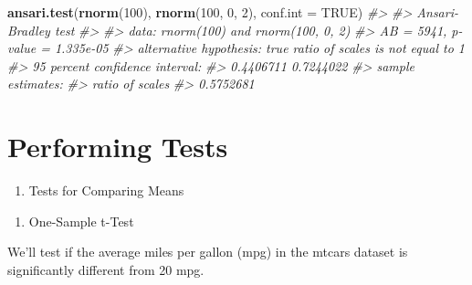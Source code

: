 \documentclass[
]{book}
\newenvironment{Shaded}{\begin{snugshade}}{\end{snugshade}}
\newcommand{\AttributeTok}[1]{\textcolor[rgb]{0.13,0.29,0.53}{#1}}
\newcommand{\CommentTok}[1]{\textcolor[rgb]{0.56,0.35,0.01}{\textit{#1}}}
\newcommand{\ConstantTok}[1]{\textcolor[rgb]{0.56,0.35,0.01}{#1}}
\newcommand{\DecValTok}[1]{\textcolor[rgb]{0.00,0.00,0.81}{#1}}
\newcommand{\FunctionTok}[1]{\textcolor[rgb]{0.13,0.29,0.53}{\textbf{#1}}}
\newcommand{\NormalTok}[1]{#1}
\newcommand{\SpecialCharTok}[1]{\textcolor[rgb]{0.81,0.36,0.00}{\textbf{#1}}}
\providecommand{\tightlist}{%
  \setlength{\itemsep}{0pt}\setlength{\parskip}{0pt}}
\begin{document}
\begin{Shaded}
\begin{Highlighting}[]
\FunctionTok{ansari.test}\NormalTok{(}\FunctionTok{rnorm}\NormalTok{(}\DecValTok{100}\NormalTok{), }\FunctionTok{rnorm}\NormalTok{(}\DecValTok{100}\NormalTok{, }\DecValTok{0}\NormalTok{, }\DecValTok{2}\NormalTok{), }\AttributeTok{conf.int =} \ConstantTok{TRUE}\NormalTok{)}
\CommentTok{\#\textgreater{} }
\CommentTok{\#\textgreater{}  Ansari{-}Bradley test}
\CommentTok{\#\textgreater{} }
\CommentTok{\#\textgreater{} data:  rnorm(100) and rnorm(100, 0, 2)}
\CommentTok{\#\textgreater{} AB = 5941, p{-}value = 1.335e{-}05}
\CommentTok{\#\textgreater{} alternative hypothesis: true ratio of scales is not equal to 1}
\CommentTok{\#\textgreater{} 95 percent confidence interval:}
\CommentTok{\#\textgreater{}  0.4406711 0.7244022}
\CommentTok{\#\textgreater{} sample estimates:}
\CommentTok{\#\textgreater{} ratio of scales }
\CommentTok{\#\textgreater{}       0.5752681}
\end{Highlighting}
\end{Shaded}

\section*{Performing Tests}\label{performing-tests}

\begin{enumerate}
\def\labelenumi{\arabic{enumi}.}
\tightlist
\item
  Tests for Comparing Means
\end{enumerate}

\begin{enumerate}
\def\labelenumi{\alph{enumi}.}
\tightlist
\item
  One-Sample t-Test
\end{enumerate}

We'll test if the average miles per gallon (mpg) in the mtcars dataset is significantly different from 20 mpg.

\begin{Shaded}
\end{Shaded}
\end{document}
